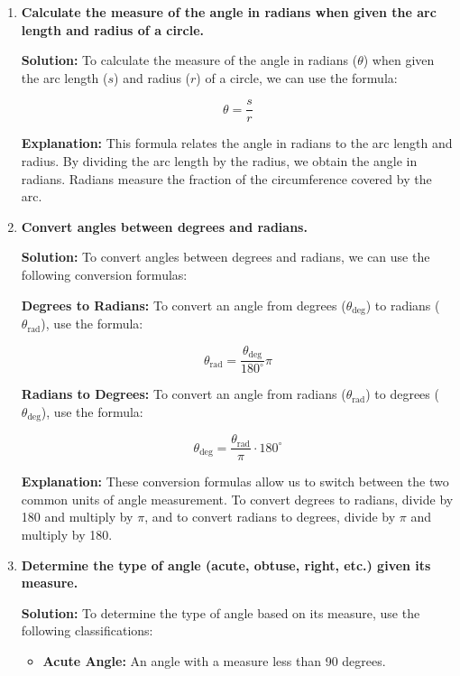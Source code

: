 \documentclass[a4paper,12pt]{book}
\begin{document}
\begin{enumerate}
    \item \textbf{Calculate the measure of the angle in radians when given the arc length and radius of a circle.}
    
    \textbf{Solution:} To calculate the measure of the angle in radians ($\theta$) when given the arc length ($s$) and radius ($r$) of a circle, we can use the formula:
    
    \[
    \theta = \frac{s}{r}
    \]
    
    \textbf{Explanation:} This formula relates the angle in radians to the arc length and radius. By dividing the arc length by the radius, we obtain the angle in radians. Radians measure the fraction of the circumference covered by the arc.
    
    \item \textbf{Convert angles between degrees and radians.}
    
    \textbf{Solution:} To convert angles between degrees and radians, we can use the following conversion formulas:
    
    \textbf{Degrees to Radians:} To convert an angle from degrees ($\theta_{\text{deg}}$) to radians ($\theta_{\text{rad}}$), use the formula:
    
    \[
    \theta_{\text{rad}} = \frac{\theta_{\text{deg}}}{180^\circ} \pi
    \]
    
    \textbf{Radians to Degrees:} To convert an angle from radians ($\theta_{\text{rad}}$) to degrees ($\theta_{\text{deg}}$), use the formula:
    
    \[
    \theta_{\text{deg}} = \frac{\theta_{\text{rad}}}{\pi} \cdot 180^\circ
    \]
    
    \textbf{Explanation:} These conversion formulas allow us to switch between the two common units of angle measurement. To convert degrees to radians, divide by 180 and multiply by $\pi$, and to convert radians to degrees, divide by $\pi$ and multiply by 180.
    
    \item \textbf{Determine the type of angle (acute, obtuse, right, etc.) given its measure.}
    
    \textbf{Solution:} To determine the type of angle based on its measure, use the following classifications:
    
    \begin{itemize}
        \item \textbf{Acute Angle:} An angle with a measure less than 90 degrees.
        

\end{itemize}
\end{enumerate}
\end{document}
